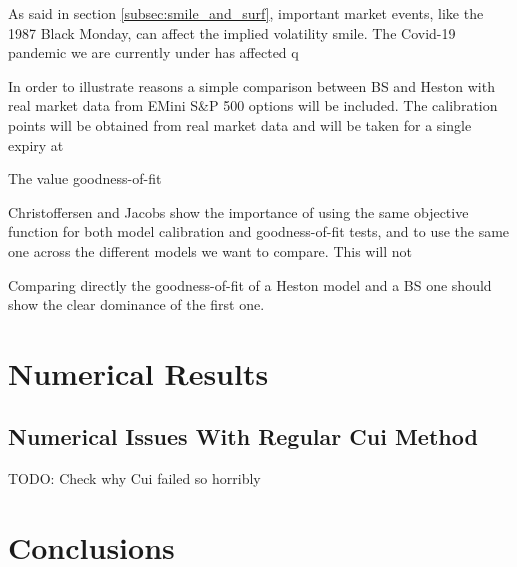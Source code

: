 \documentclass[12,twoside]{mammeTFM}
\theoremstyle{definition}
\theoremstyle{remark}
\begin{document}
As said in section \ref{subsec:smile_and_surf}, important market events, like the 1987 Black Monday, can affect the implied volatility smile. The Covid-19 pandemic we are currently under has affected q

In order to illustrate reasons a simple comparison between BS and Heston with real market data from EMini S\&P 500 options will be included. The calibration points will be obtained from real market data and will be taken for a single expiry at 

The value goodness-of-fit 

Christoffersen and Jacobs \cite{chr02} show the importance of using the same objective function for both model calibration and goodness-of-fit tests, and to use the same one across the different models we want to compare. This will not 

Comparing directly the goodness-of-fit of a Heston model and a BS one should show the clear dominance of the first one.

\section{Numerical Results}

\subsection{Numerical Issues With Regular Cui Method}

TODO: Check why Cui failed so horribly

\section{Conclusions}
\end{document}
